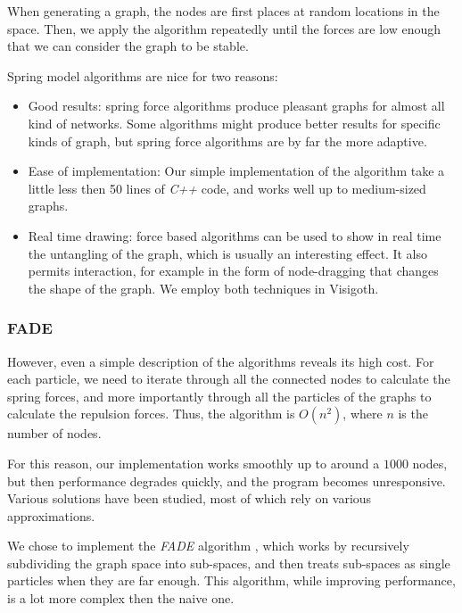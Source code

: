 \documentclass[a4paper,11pt,titlepage]{article}
\newcommand{\buzz}[1]{\emph{#1}}
\begin{document}
When generating a graph, the nodes are first places at random
locations in the space. Then, we apply the algorithm repeatedly until
the forces are low enough that we can consider the graph to be stable.

Spring model algorithms are nice for two reasons:

\begin{itemize}
\item Good results: spring force algorithms produce pleasant graphs
  for almost all kind of networks. Some algorithms might produce
  better results for specific kinds of graph, but spring force
  algorithms are by far the more adaptive.

\item Ease of implementation: Our simple implementation of the
  algorithm take a little less then 50 lines of \buzz{C++} code, and
  works well up to medium-sized graphs.

\item Real time drawing: force based algorithms can be used to show in
  real time the untangling of the graph, which is usually an
  interesting effect. It also permits interaction, for example in the
  form of node-dragging that changes the shape of the graph. We employ
  both techniques in Visigoth.
\end{itemize}

\subsubsection{FADE}

However, even a simple description of the algorithms reveals its high
cost. For each particle, we need to iterate through all the connected
nodes to calculate the spring forces, and more importantly through all
the particles of the graphs to calculate the repulsion forces. Thus,
the algorithm is \(O(n^2)\), where \(n\) is the number of nodes.

For this reason, our implementation works smoothly up to around a
\(1000\) nodes, but then performance degrades quickly, and the program
becomes unresponsive. Various solutions have been studied, most of
which rely on various approximations.

We chose to implement the \emph{FADE} algorithm \cite{fade}, which works by
recursively subdividing the graph space into sub-spaces, and then
treats sub-spaces as single particles when they are far enough. This
algorithm, while improving performance, is a lot more complex then the
naive one.
\end{document}
